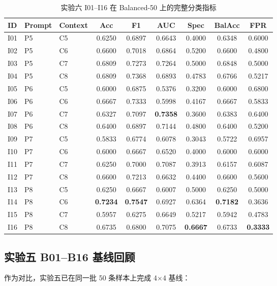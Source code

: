 \documentclass{experimentreport}
\begin{document}
\begin{table}[htbp]
\centering
\caption{实验六 I01--I16 在 Balanced-50 上的完整分类指标}
\small
\begin{tabular}{lllcccccc}
\toprule
ID & Prompt & Context & Acc & F1 & AUC & Spec & BalAcc & FPR \\
\midrule
I01 & P5 & C5 & 0.6250 & 0.6897 & 0.6643 & 0.4000 & 0.6348 & 0.6000 \\
I02 & P5 & C6 & 0.6600 & 0.7018 & 0.6864 & 0.5200 & 0.6600 & 0.4800 \\
I03 & P5 & C7 & 0.6809 & 0.7273 & 0.7264 & 0.5000 & 0.6848 & 0.5000 \\
I04 & P5 & C8 & 0.6809 & 0.7368 & 0.6893 & 0.4783 & 0.6766 & 0.5217 \\
I05 & P6 & C5 & 0.6000 & 0.6875 & 0.5376 & 0.3200 & 0.6000 & 0.6800 \\
I06 & P6 & C6 & 0.6667 & 0.7333 & 0.5998 & 0.4167 & 0.6667 & 0.5833 \\
I07 & P6 & C7 & 0.6327 & 0.7097 & \textbf{0.7358} & 0.3600 & 0.6383 & 0.6400 \\
I08 & P6 & C8 & 0.6400 & 0.6897 & 0.7144 & 0.4800 & 0.6400 & 0.5200 \\
I09 & P7 & C5 & 0.5833 & 0.6774 & 0.6078 & 0.3043 & 0.5722 & 0.6957 \\
I10 & P7 & C6 & 0.6000 & 0.6667 & 0.6520 & 0.4000 & 0.6000 & 0.6000 \\
I11 & P7 & C7 & 0.6250 & 0.7000 & 0.7087 & 0.3913 & 0.6157 & 0.6087 \\
I12 & P7 & C8 & 0.6600 & 0.7213 & 0.6632 & 0.4400 & 0.6600 & 0.5600 \\
I13 & P8 & C5 & 0.6250 & 0.6667 & 0.6007 & 0.5000 & 0.6250 & 0.5000 \\
I14 & P8 & C6 & \textbf{0.7234} & \textbf{0.7547} & 0.6927 & 0.6364 & \textbf{0.7182} & 0.3636 \\
I15 & P8 & C7 & 0.5957 & 0.6275 & 0.6649 & 0.5217 & 0.5942 & 0.4783 \\
I16 & P8 & C8 & 0.6735 & 0.6800 & 0.7075 & \textbf{0.6667} & 0.6733 & \textbf{0.3333} \\
\bottomrule
\end{tabular}
\end{table}

\subsection{实验五 B01--B16 基线回顾}

作为对比，实验五已在同一批 50 条样本上完成 4$\times$4 基线：
\end{document}
